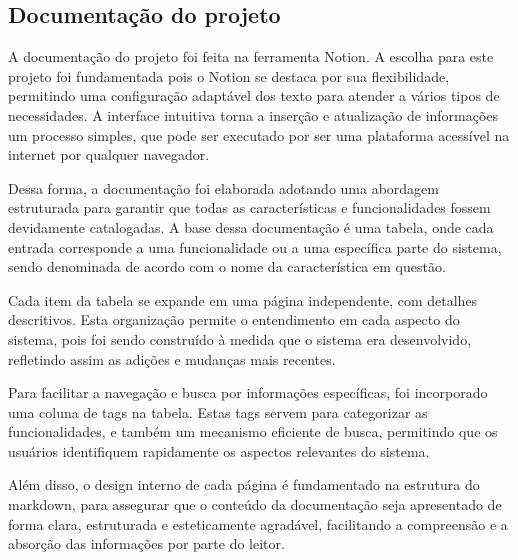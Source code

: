 \subsection{Documentação do projeto}\label{sec:documentation}
A documentação do projeto foi feita na ferramenta Notion. A escolha para este projeto foi fundamentada pois o Notion se destaca por sua flexibilidade, permitindo uma configuração adaptável dos texto para atender a vários tipos de necessidades. A interface intuitiva torna a inserção e atualização de informações um processo simples, que pode ser executado por ser uma plataforma acessível na internet por qualquer navegador.

Dessa forma, a documentação foi elaborada adotando uma abordagem estruturada para garantir que todas as características e funcionalidades fossem devidamente catalogadas. A base dessa documentação é uma tabela, onde cada entrada corresponde a uma funcionalidade ou a uma específica parte do sistema, sendo denominada de acordo com o nome da característica em questão.

Cada item da tabela se expande em uma página independente, com detalhes descritivos. Esta organização permite o entendimento em cada aspecto do sistema, pois foi sendo construído à medida que o sistema era desenvolvido, refletindo assim as adições e mudanças mais recentes.

Para facilitar a navegação e busca por informações específicas, foi incorporado uma coluna de tags na tabela. Estas tags servem para categorizar as funcionalidades, e também um mecanismo eficiente de busca, permitindo que os usuários identifiquem rapidamente os aspectos relevantes do sistema.

Além disso, o design interno de cada página é fundamentado na estrutura do markdown, para assegurar que o conteúdo da documentação seja apresentado de forma clara, estruturada e esteticamente agradável, facilitando a compreensão e a absorção das informações por parte do leitor.

